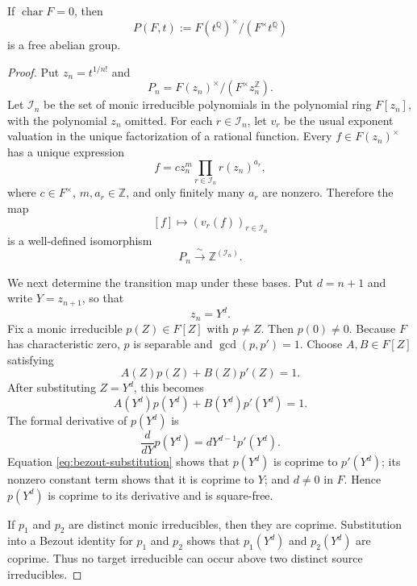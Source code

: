 \documentclass[10pt,a4paper]{amsart}
\newcommand{\Q}{\mathbb Q}
\newcommand{\Z}{\mathbb Z}
\begin{document}
\begin{lemma}\label{lem:puiseux-free}
If $\operatorname{char}F=0$, then
\[
  P(F,t):=F(t^{\Q})^\times/(F^\times t^{\Q})
\]
is a free abelian group.
\end{lemma}

\begin{proof}
Put $z_n=t^{1/n!}$ and
\[
  P_n=F(z_n)^\times/(F^\times z_n^{\Z}).
\]
Let $\mathcal I_n$ be the set of monic irreducible polynomials in the
polynomial ring $F[z_n]$, with the polynomial $z_n$ omitted.  For each
$r\in\mathcal I_n$, let $v_r$ be the usual exponent valuation in the unique
factorization of a rational function.  Every $f\in F(z_n)^\times$ has a
unique expression
\begin{equation}\label{eq:rational-factorization}
  f=c z_n^m\prod_{r\in\mathcal I_n}r(z_n)^{a_r},
\end{equation}
where $c\in F^\times$, $m,a_r\in\Z$, and only finitely many $a_r$ are
nonzero.  Therefore the map
\[
  [f]\longmapsto (v_r(f))_{r\in\mathcal I_n}
\]
is a well-defined isomorphism
\begin{equation}\label{eq:Pn-free}
  P_n\xrightarrow{\ \sim\ }\Z^{(\mathcal I_n)}.
\end{equation}

We next determine the transition map under these bases.  Put $d=n+1$ and
write $Y=z_{n+1}$, so that
\begin{equation}\label{eq:stage-substitution}
  z_n=Y^d.
\end{equation}
Fix a monic irreducible $p(Z)\in F[Z]$ with $p\neq Z$.  Then $p(0)\neq0$.
Because $F$ has characteristic zero, $p$ is separable and
$\gcd(p,p')=1$.  Choose $A,B\in F[Z]$ satisfying
\[
  A(Z)p(Z)+B(Z)p'(Z)=1.
\]
After substituting $Z=Y^d$, this becomes
\begin{equation}\label{eq:bezout-substitution}
  A(Y^d)p(Y^d)+B(Y^d)p'(Y^d)=1.
\end{equation}
The formal derivative of $p(Y^d)$ is
\[
  \frac{d}{dY}p(Y^d)=dY^{d-1}p'(Y^d).
\]
Equation \cref{eq:bezout-substitution} shows that $p(Y^d)$ is coprime to
$p'(Y^d)$; its nonzero constant term shows that it is coprime to $Y$; and
$d\neq0$ in $F$.  Hence $p(Y^d)$ is coprime to its derivative and is
square-free.

If $p_1$ and $p_2$ are distinct monic irreducibles, then they are coprime.
Substitution into a Bezout identity for $p_1$ and $p_2$ shows that
$p_1(Y^d)$ and $p_2(Y^d)$ are coprime.  Thus no target irreducible can
occur above two distinct source irreducibles.


\end{proof}
\end{document}
